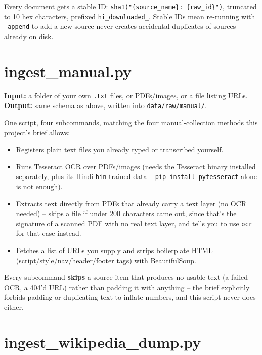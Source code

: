 \documentclass[11pt]{report}
\begin{document}
Every document gets a stable ID: \texttt{sha1("\{source\_name\}:
\{raw\_id\}")}, truncated to 10 hex characters, prefixed
\texttt{hi\_downloaded\_}. Stable IDs mean re-running with
\texttt{--append} to add a new source never creates accidental
duplicates of sources already on disk.

\section{ingest\_manual.py}

\textbf{Input:} a folder of your own \texttt{.txt} files, or PDFs/images,
or a file listing URLs. \textbf{Output:} same schema as above, written
into \texttt{data/raw/manual/}.

One script, four subcommands, matching the four manual-collection methods
this project's brief allows:

\begin{itemize}[leftmargin=1.4cm]
\item[\texttt{typed}] Registers plain text files you already typed or
transcribed yourself.
\item[\texttt{ocr}] Runs Tesseract OCR over PDFs/images (needs the
Tesseract binary installed separately, plus its Hindi \texttt{hin}
trained data -- \texttt{pip install pytesseract} alone is not enough).
\item[\texttt{pdf}] Extracts text directly from PDFs that already carry
a text layer (no OCR needed) -- skips a file if under 200 characters
came out, since that's the signature of a scanned PDF with no real text
layer, and tells you to use \texttt{ocr} for that case instead.
\item[\texttt{scrape}] Fetches a list of URLs you supply and strips
boilerplate HTML (script/style/nav/header/footer tags) with
BeautifulSoup.
\end{itemize}

\begin{notebox}
Every subcommand \textbf{skips} a source item that produces no usable
text (a failed OCR, a 404'd URL) rather than padding it with anything --
the brief explicitly forbids padding or duplicating text to inflate
numbers, and this script never does either.
\end{notebox}

\section{ingest\_wikipedia\_dump.py}
\end{document}
